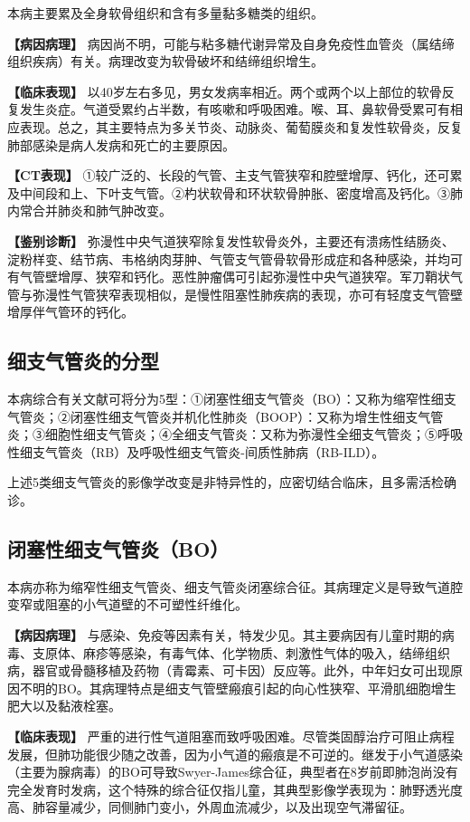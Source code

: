 本病主要累及全身软骨组织和含有多量黏多糖类的组织。

\textbf{【病因病理】}
病因尚不明，可能与粘多糖代谢异常及自身免疫性血管炎（属结缔组织疾病）有关。病理改变为软骨破坏和结缔组织增生。

\textbf{【临床表现】}
以40岁左右多见，男女发病率相近。两个或两个以上部位的软骨反复发生炎症。气道受累约占半数，有咳嗽和呼吸困难。喉、耳、鼻软骨受累可有相应表现。总之，其主要特点为多关节炎、动脉炎、葡萄膜炎和复发性软骨炎，反复肺部感染是病人发病和死亡的主要原因。

\textbf{【CT表现】}
①较广泛的、长段的气管、主支气管狭窄和腔壁增厚、钙化，还可累及中间段和上、下叶支气管。②杓状软骨和环状软骨肿胀、密度增高及钙化。③肺内常合并肺炎和肺气肿改变。

\textbf{【鉴别诊断】}
弥漫性中央气道狭窄除复发性软骨炎外，主要还有溃疡性结肠炎、淀粉样变、结节病、韦格纳肉芽肿、气管支气管骨软骨形成症和各种感染，并均可有气管壁增厚、狭窄和钙化。恶性肿瘤偶可引起弥漫性中央气道狭窄。军刀鞘状气管与弥漫性气管狭窄表现相似，是慢性阻塞性肺疾病的表现，亦可有轻度支气管壁增厚伴气管环的钙化。

\subsection{细支气管炎的分型}

本病综合有关文献可将分为5型：①闭塞性细支气管炎（BO）：又称为缩窄性细支气管炎；②闭塞性细支气管炎并机化性肺炎（BOOP）：又称为增生性细支气管炎；③细胞性细支气管炎；④全细支气管炎：又称为弥漫性全细支气管炎；⑤呼吸性细支气管炎（RB）及呼吸性细支气管炎-间质性肺病（RB-ILD）。

上述5类细支气管炎的影像学改变是非特异性的，应密切结合临床，且多需活检确诊。

\subsection{闭塞性细支气管炎（BO）}

本病亦称为缩窄性细支气管炎、细支气管炎闭塞综合征。其病理定义是导致气道腔变窄或阻塞的小气道壁的不可塑性纤维化。

\textbf{【病因病理】}
与感染、免疫等因素有关，特发少见。其主要病因有儿童时期的病毒、支原体、麻疹等感染，有毒气体、化学物质、刺激性气体的吸入，结缔组织病，器官或骨髓移植及药物（青霉素、可卡因）反应等。此外，中年妇女可出现原因不明的BO。其病理特点是细支气管壁瘢痕引起的向心性狭窄、平滑肌细胞增生肥大以及黏液栓塞。

\textbf{【临床表现】}
严重的进行性气道阻塞而致呼吸困难。尽管类固醇治疗可阻止病程发展，但肺功能很少随之改善，因为小气道的瘢痕是不可逆的。继发于小气道感染（主要为腺病毒）的BO可导致Swyer-James综合征，典型者在8岁前即肺泡尚没有完全发育时发病，这个特殊的综合征仅指儿童，其典型影像学表现为：肺野透光度高、肺容量减少，同侧肺门变小，外周血流减少，以及出现空气滞留征。

